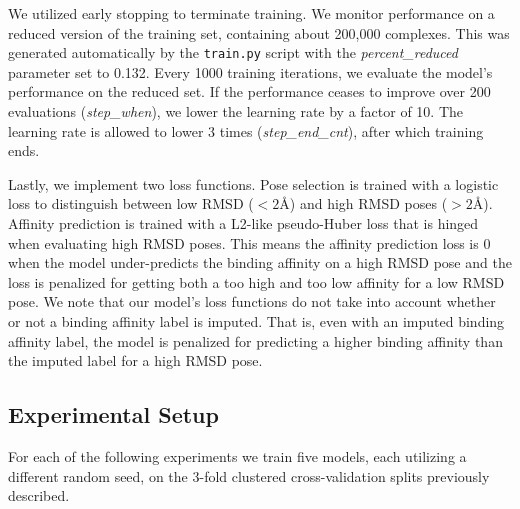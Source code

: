 \documentclass[journal=jcim,manuscript=article]{achemso}
\begin{document}
We utilized early stopping to terminate training.
We monitor performance on a reduced version of the training set, containing about 200,000 complexes.
This was generated automatically by the \texttt{train.py} script with the \textit{percent\_reduced} parameter set to 0.132.
Every 1000 training iterations, we evaluate the model's performance on the reduced set.
If the performance ceases to improve over 200 evaluations (\textit{step\_when}), we lower the learning rate by a factor of 10.
The learning rate is allowed to lower 3 times (\textit{step\_end\_cnt}), after which training ends.

Lastly, we implement two loss functions.
Pose selection is trained with a logistic loss to distinguish between low RMSD ($<2${\AA}) and high RMSD poses ($>2${\AA}).
Affinity prediction is trained with a L2-like pseudo-Huber loss that is hinged when evaluating high RMSD poses.
This means the affinity prediction loss is 0 when the model under-predicts the binding affinity on a high RMSD pose and the loss is penalized for getting both a too high and too low affinity for a low RMSD pose.
We note that our model's loss functions do not take into account whether or not a binding affinity label is imputed.
That is, even with an imputed binding affinity label, the model is penalized for predicting a higher binding affinity than the imputed label for a high RMSD pose.

\subsection{Experimental Setup}
For each of the following experiments we train five models, each utilizing a different random seed, on the 3-fold clustered cross-validation splits previously described.
\end{document}

